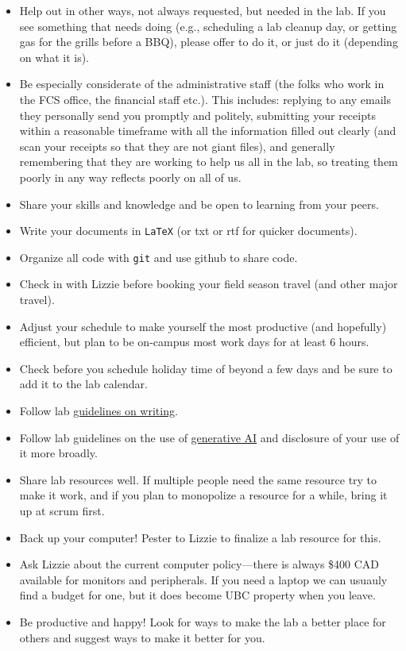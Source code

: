 \documentclass[11pt,a4paper,oneside]{article}
\begin{document}
\begin{itemize}
During your time in the lab you'll be asked to pitch in on various lab tasks and manage various resources. Some examples include: keeping the lab vehicle on top of its inspections; helping design, collect seeds or aid big experiments or long-term research; bring snacks to lab meeting, helping schedule invited speakers, etc.. Please help when asked to contribute to keeping the lab running well. 
\item Help out in other ways, not always requested, but needed in the lab. If you see something that needs doing (e.g., scheduling a lab cleanup day, or getting gas for the grills before a BBQ), please offer to do it, or just do it (depending on what it is). 
\item Be especially considerate of the administrative staff (the folks who work in the FCS office, the financial staff etc.). This includes: replying to any emails they personally send you promptly and politely, submitting your receipts within a reasonable timeframe with all the information filled out clearly (and scan your receipts so that they are not giant files), and generally remembering that they are working to help us all in the lab, so treating them poorly in any way reflects poorly on all of us. 
\item Share your skills and knowledge and be open to learning from your peers. 
\item Write your documents in \verb|LaTeX| (or txt or rtf for quicker documents).
\item Organize all code with \verb|git| and use github to share code.
\item Check in with Lizzie before booking your field season travel (and other major travel). 
\item Adjust your schedule to make yourself the most productive (and hopefully) efficient, but plan to be on-campus most work days for at least 6 hours.
\item Check before you schedule holiday time of beyond a few days and be sure to add it to the lab calendar.
\item Follow lab \href{https://github.com/temporalecologylab/labgit/blob/master/expectations/writing/tempeco_writing.pdf}{guidelines on writing}.
\item Follow lab guidelines on the use of \href{https://github.com/temporalecologylab/labgit/blob/master/expectations/genAI_labguidelines.pdf}{generative AI} and disclosure of your use of it more broadly. 
\item Share lab resources well. If multiple people need the same resource try to make it work, and if you plan to monopolize a resource for a while, bring it up at scrum first. 
\item Back up your computer! Pester to Lizzie to finalize a lab resource for this.
\item Ask Lizzie about the current computer policy---there is always \$400 CAD available for monitors and peripherals. If you need a laptop we can usuauly find a budget for one, but it does become UBC property when you leave. 
\item Be productive and happy! Look for ways to make the lab a better place for others and suggest ways to make it better for you. 
\end{itemize}
\end{document}
